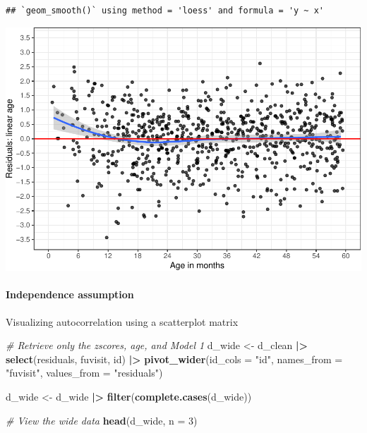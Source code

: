 \documentclass[
]{article}
\newenvironment{Shaded}{\begin{snugshade}}{\end{snugshade}}
\newcommand{\AttributeTok}[1]{\textcolor[rgb]{0.13,0.29,0.53}{#1}}
\newcommand{\CommentTok}[1]{\textcolor[rgb]{0.56,0.35,0.01}{\textit{#1}}}
\newcommand{\DecValTok}[1]{\textcolor[rgb]{0.00,0.00,0.81}{#1}}
\newcommand{\FunctionTok}[1]{\textcolor[rgb]{0.13,0.29,0.53}{\textbf{#1}}}
\newcommand{\NormalTok}[1]{#1}
\newcommand{\OtherTok}[1]{\textcolor[rgb]{0.56,0.35,0.01}{#1}}
\newcommand{\SpecialCharTok}[1]{\textcolor[rgb]{0.81,0.36,0.00}{\textbf{#1}}}
\newcommand{\StringTok}[1]{\textcolor[rgb]{0.31,0.60,0.02}{#1}}
\begin{document}
\begin{verbatim}
## `geom_smooth()` using method = 'loess' and formula = 'y ~ x'
\end{verbatim}

\includegraphics{ProblemSet3_ts_1677791812_files/figure-latex/unnamed-chunk-8-1.pdf}

\hypertarget{independence-assumption}{%
\paragraph{Independence assumption}\label{independence-assumption}}

Visualizing autocorrelation using a scatterplot matrix

\begin{Shaded}
\begin{Highlighting}[]
\CommentTok{\# Retrieve only the zscores, age, and Model 1}
\NormalTok{d\_wide }\OtherTok{\textless{}{-}}\NormalTok{ d\_clean }\SpecialCharTok{|\textgreater{}}
  \FunctionTok{select}\NormalTok{(residuals, fuvisit, id) }\SpecialCharTok{|\textgreater{}}
  \FunctionTok{pivot\_wider}\NormalTok{(}\AttributeTok{id\_cols =} \StringTok{"id"}\NormalTok{,}
              \AttributeTok{names\_from =} \StringTok{"fuvisit"}\NormalTok{,}
              \AttributeTok{values\_from =} \StringTok{"residuals"}\NormalTok{)}

\NormalTok{d\_wide }\OtherTok{\textless{}{-}}\NormalTok{ d\_wide }\SpecialCharTok{|\textgreater{}}
  \FunctionTok{filter}\NormalTok{(}\FunctionTok{complete.cases}\NormalTok{(d\_wide))}

\CommentTok{\# View the wide data}
\FunctionTok{head}\NormalTok{(d\_wide, }\AttributeTok{n =} \DecValTok{3}\NormalTok{)}
\end{Highlighting}
\end{Shaded}
\end{document}
